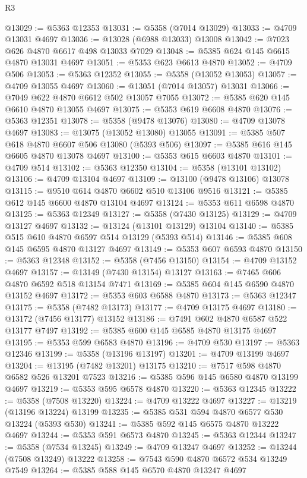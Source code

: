\begin{lexlean}{R3}
\begin{coremodule}
@13029 := @5363 @12353
@13031 := @5358 (@7014 @13029)
@13033 := @4709 @13031 @4697
@13036 := @13028 (@6988 @13033) @13008
@13042 := @7023 @626 @4870 @6617 @498 @13033 @7029
@13048 := @5385 @624 @145 @6615 @4870 @13031 @4697
@13051 := @5353 @623 @6613 @4870
@13052 := @4709 @506
@13053 := @5363 @12352
@13055 := @5358 (@13052 @13053)
@13057 := @4709 @13055 @4697
@13060 := @13051 (@7014 @13057) @13031
@13066 := @7049 @622 @4870 @6612 @502 @13057 @7055
@13072 := @5385 @620 @145 @6610 @4870 @13055 @4697
@13075 := @5353 @619 @6608 @4870
@13076 := @5363 @12351
@13078 := @5358 (@9478 @13076)
@13080 := @4709 @13078 @4697
@13083 := @13075 (@13052 @13080) @13055
@13091 := @5385 @507 @618 @4870 @6607 @506 @13080 (@5393 @506)
@13097 := @5385 @616 @145 @6605 @4870 @13078 @4697
@13100 := @5353 @615 @6603 @4870
@13101 := @4709 @514
@13102 := @5363 @12350
@13104 := @5358 (@13101 @13102)
@13106 := @4709 @13104 @4697
@13109 := @13100 (@9478 @13106) @13078
@13115 := @9510 @614 @4870 @6602 @510 @13106 @9516
@13121 := @5385 @612 @145 @6600 @4870 @13104 @4697
@13124 := @5353 @611 @6598 @4870
@13125 := @5363 @12349
@13127 := @5358 (@7430 @13125)
@13129 := @4709 @13127 @4697
@13132 := @13124 (@13101 @13129) @13104
@13140 := @5385 @515 @610 @4870 @6597 @514 @13129 (@5393 @514)
@13146 := @5385 @608 @145 @6595 @4870 @13127 @4697
@13149 := @5353 @607 @6593 @4870
@13150 := @5363 @12348
@13152 := @5358 (@7456 @13150)
@13154 := @4709 @13152 @4697
@13157 := @13149 (@7430 @13154) @13127
@13163 := @7465 @606 @4870 @6592 @518 @13154 @7471
@13169 := @5385 @604 @145 @6590 @4870 @13152 @4697
@13172 := @5353 @603 @6588 @4870
@13173 := @5363 @12347
@13175 := @5358 (@7482 @13173)
@13177 := @4709 @13175 @4697
@13180 := @13172 (@7456 @13177) @13152
@13186 := @7491 @602 @4870 @6587 @522 @13177 @7497
@13192 := @5385 @600 @145 @6585 @4870 @13175 @4697
@13195 := @5353 @599 @6583 @4870
@13196 := @4709 @530
@13197 := @5363 @12346
@13199 := @5358 (@13196 @13197)
@13201 := @4709 @13199 @4697
@13204 := @13195 (@7482 @13201) @13175
@13210 := @7517 @598 @4870 @6582 @526 @13201 @7523
@13216 := @5385 @596 @145 @6580 @4870 @13199 @4697
@13219 := @5353 @595 @6578 @4870
@13220 := @5363 @12345
@13222 := @5358 (@7508 @13220)
@13224 := @4709 @13222 @4697
@13227 := @13219 (@13196 @13224) @13199
@13235 := @5385 @531 @594 @4870 @6577 @530 @13224 (@5393 @530)
@13241 := @5385 @592 @145 @6575 @4870 @13222 @4697
@13244 := @5353 @591 @6573 @4870
@13245 := @5363 @12344
@13247 := @5358 (@7534 @13245)
@13249 := @4709 @13247 @4697
@13252 := @13244 (@7508 @13249) @13222
@13258 := @7543 @590 @4870 @6572 @534 @13249 @7549
@13264 := @5385 @588 @145 @6570 @4870 @13247 @4697

\end{coremodule}
\end{lexlean}
